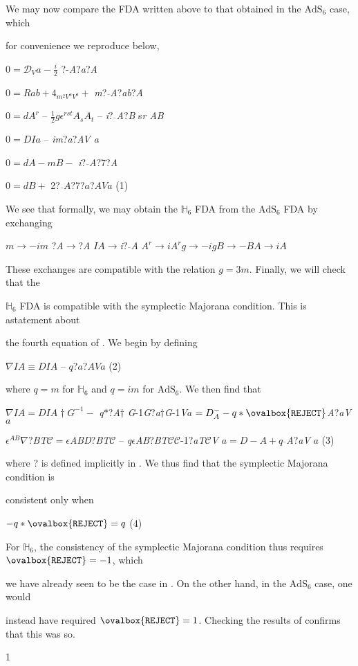 \documentclass[a4paper,12pt]{article}
\begin{document}
We may now compare the FDA written above to that obtained in the $\mathrm{A}\mathrm{d}\mathrm{S}_{6}$ case, which

for convenience we reproduce below,

$0 = \mathcal{D}_{V}a - \displaystyle \frac{i}{2}$ ?-{\it A}?{\it a}?{\it A}

$0 =Rab + 4_{m^{2}V^{a}V^{b}} +$ {\it m}?$\overline{}${\it A}?{\it ab}?{\it A}

$0 = dA^{r}$ -- $\displaystyle \frac{1}{2}g\epsilon^{rst}A_{s}A_{t}$ -- {\it i}?$\overline{}${\it A}?{\it B} s{\it r AB}

$0 =DI a$ -- {\it im}?{\it a}?{\it AV a}

$0=dA-mB -$ {\it i}?$\overline{}${\it A}?7?{\it A}
\begin{center}
$0=dB+$ 2?$\overline {}A$?7?$a$?$AVa$   (1)
\end{center}
We see that formally, we may obtain the $\mathbb{H}_{6}$ FDA from the $\mathrm{A}\mathrm{d}\mathrm{S}_{6}$ FDA by exchanging

$m\rightarrow-im$ ?{\it A}$\rightarrow$?{\it A} $ I A\rightarrow${\it i}?$\overline{}${\it A} $A^{r}\rightarrow iA^{r} g\rightarrow-ig B\rightarrow-B A\rightarrow iA$

These exchanges are compatible with the relation $g=3m$. Finally, we will check that the

$\mathbb{H}_{6}$ FDA is compatible with the symplectic Majorana condition. This is astatement about

the fourth equation of . We begin by defining
\begin{center}
$\nabla I A\equiv DI A$ -- $q$?$a$?$AV a$   (2)
\end{center}
where $q=m$ for $\mathbb{H}_{6}$ and $q=im$ for $\mathrm{A}\mathrm{d}\mathrm{S}_{6}$. We then find that

$\nabla I A=DI A\dagger G^{-1}-$ {\it q}$*$?{\it A}$\dagger$ {\it G}-1{\it G}?{\it a}$\dagger${\it G}-1{\it Va} $=D_{A}^{-}-q*\ovalbox{\tt\small REJECT} \overline{}${\it A}?{\it aV} $a$

$\epsilon^{AB} \nabla$?{\it BT}$\mathcal{C} = \epsilon${\it ABD}?{\it BT}$\mathcal{C}$ -- {\it q}$\epsilon${\it AB}?{\it BT}$\mathcal{C}\mathcal{C}$-1?{\it aT}$\mathcal{C}${\it V} $a= D -A + q \overline{}${\it A}?{\it aV} $a$ (3)

where ? is defined implicitly in . We thus find that the symplectic Majorana condition is

consistent only when
\begin{center}
$- q*\ovalbox{\tt\small REJECT}=q$   (4)
\end{center}
For $\mathbb{H}_{6}$, the consistency of the symplectic Majorana condition thus requires $\ovalbox{\tt\small REJECT}=-1$, which

we have already seen to be the case in . On the other hand, in the $\mathrm{A}\mathrm{d}\mathrm{S}_{6}$ case, one would

instead have required $\ovalbox{\tt\small REJECT}=1$. Checking the results of confirms that this was so.

1
\end{document}
